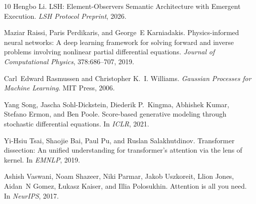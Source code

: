 \documentclass{article}
\begin{document}
\begin{thebibliography}{10}
Hengbo Li.
\newblock LSH: Element-Observers Semantic Architecture with Emergent Execution.
\newblock \emph{LSH Protocol Preprint}, 2026.

Maziar Raissi, Paris Perdikaris, and George~E Karniadakis.
\newblock Physics-informed neural networks: A deep learning framework for solving forward and inverse problems involving nonlinear partial differential equations.
\newblock \emph{Journal of Computational Physics}, 378:686--707, 2019.

Carl~Edward Rasmussen and Christopher K.~I. Williams.
\newblock \textit{Gaussian Processes for Machine Learning}.
\newblock MIT Press, 2006.

Yang Song, Jascha Sohl-Dickstein, Diederik P.~Kingma, Abhishek Kumar, Stefano Ermon, and Ben Poole.
\newblock Score-based generative modeling through stochastic differential equations.
\newblock In \emph{ICLR}, 2021.

Yi-Hsiu Tsai, Shaojie Bai, Paul Pu, and Ruslan Salakhutdinov.
\newblock Transformer dissection: An unified understanding for transformer's attention via the lens of kernel.
\newblock In \emph{EMNLP}, 2019.

Ashish Vaswani, Noam Shazeer, Niki Parmar, Jakob Uszkoreit, Llion Jones, Aidan~N Gomez, {\L}ukasz Kaiser, and Illia Polosukhin.
\newblock Attention is all you need.
\newblock In \emph{NeurIPS}, 2017.

\end{thebibliography}
\end{document}
